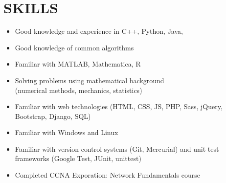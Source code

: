 \documentclass[line,margin]{res}
\begin{document}
%
%

%


\section{SKILLS}
\begin{itemize}
  \item Good knowledge and experience in C++, Python, Java,
  \item Good knowledge of common algorithms
  \item Familiar with MATLAB, Mathematica, R
  \item Solving problems using mathematical background
  \\ (numerical methods, mechanics, statistics)
  \item Familiar with web technologies (HTML, CSS, JS, PHP, Sass, jQuery, Bootstrap,
  Django, SQL)
  \item Familiar with Windows and Linux
  \item Familiar with version control systems (Git, Mercurial) and unit test
  frameworks (Google Test, JUnit, unittest)
  \item Completed CCNA Exporation: Network Fundamentals course
\end{itemize}
\end{document}
